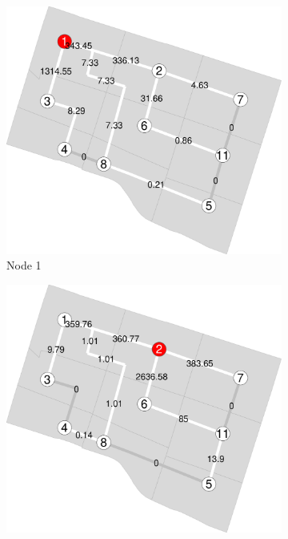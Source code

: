 \documentclass[]{elsarticle} %
\begin{document}
\begin{figure}
\begin{subfigure}{0.32\textwidth}
  \centering
  \includegraphics[width=1\linewidth]{Plots/sp1.pdf}  
  \caption{Node 1}
\end{subfigure}
\begin{subfigure}{0.32\textwidth}
  \centering
  \includegraphics[width=1\linewidth]{Plots/sp2.pdf}  

\end{subfigure}
\end{figure}
\end{document}
